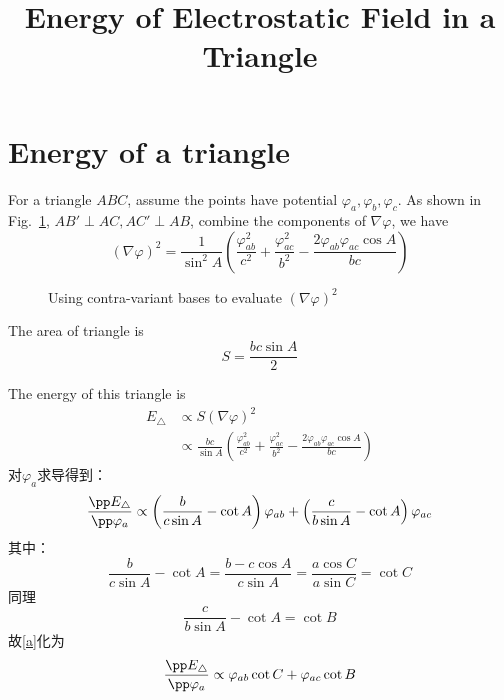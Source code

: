\documentclass{article}
\begin{document}
\title{Energy of Electrostatic Field in a Triangle}
\author{\zpj}
\maketitle
\section{Energy of a triangle}
For a triangle $ABC$, assume the points have potential $\varphi_a,\varphi_b,\varphi_c$. As shown in Fig.~\ref{nab}, $AB'\perp AC, AC'\perp AB$, combine the components of $\nabla\varphi$, we have
\[(\nabla\varphi)^2=\frac{1}{\sin^2 A}\left(\frac{\varphi_{ab}^2}{c^2}+\frac{\varphi_{ac}^2}{b^2}-\frac{2\varphi_{ab}\varphi_{ac}\cos A}{bc}\right)\]
\begin{figure}[htbp]
\centering
 \caption{Using contra-variant bases to evaluate $(\nabla\varphi)^2$}\label{nab}
\end{figure}

The area of triangle is
\[S=\frac{bc\sin A}{2}\]

The energy of this triangle is
\begin{align}
 E_{\triangle}&\propto S(\nabla\varphi)^2\\
 &\propto \frac{bc}{\sin A}\left(\frac{\varphi_{ab}^2}{c^2}+\frac{\varphi_{ac}^2}{b^2}-\frac{2\varphi_{ab}\varphi_{ac}\cos A}{bc}\right)
\end{align}
对$\varphi_a$求导得到：
\begin{equation}
 \frac{\pp E_\triangle}{\pp \varphi_a}\propto \left(\frac{b}{c\sin A}-\cot A\right)\varphi_{ab}+\left(\frac{c}{b\sin A}-\cot A\right)\varphi_{ac}\label{a}
\end{equation}
其中：
\[\frac{b}{c\sin A}-\cot A=\frac{b-c\cos A}{c\sin A}=\frac{a\cos C}{a\sin C}=\cot C\]
同理\[\frac{c}{b\sin A}-\cot A=\cot B\]
故\ref{a}化为
\begin{equation}
 \frac{\pp E_\triangle}{\pp \varphi_a}\propto \varphi_{ab}\cot C+\varphi_{ac}\cot B
 \label{comp}
\end{equation}
\end{document}
